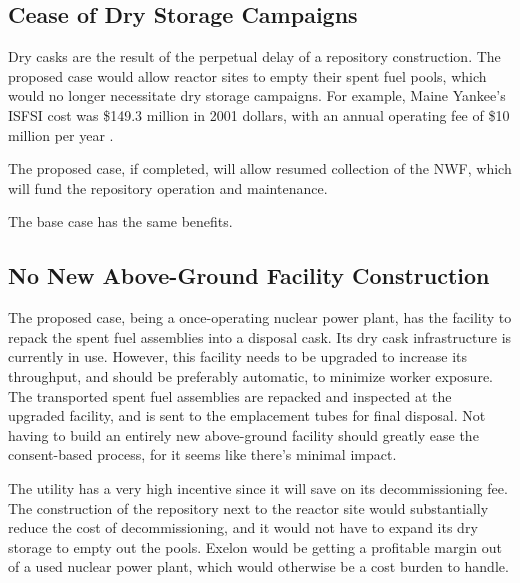  
\subsection{Cease of Dry Storage Campaigns}

Dry casks are the result of the perpetual delay of a repository construction.
The proposed case would allow reactor sites to empty their spent fuel pools, which
would no longer necessitate dry storage campaigns. For example, Maine Yankee's 
\gls{ISFSI} cost was \$149.3 million in 2001 dollars, with an annual operating fee
of \$10 million per year \cite{lee_costing_2009}. 

The proposed case, if completed, will allow resumed collection of the \gls{NWF}, 
which will fund the repository operation and maintenance.

The base case has the same benefits.



\subsection{No New Above-Ground Facility Construction}



The proposed case, being a once-operating nuclear power plant, has the facility to 
repack the spent fuel assemblies into a disposal cask. Its dry cask infrastructure 
is currently in use. However, this facility needs to be upgraded to increase its throughput, and should be preferably automatic, to minimize worker exposure. The transported spent fuel assemblies are repacked and inspected at the upgraded facility, and is sent to the emplacement tubes for final disposal. Not having to build an entirely new above-ground facility should greatly ease the consent-based process, for it seems like there's minimal impact. 
 
The utility has a very high incentive since it will save on its decommissioning fee.
The construction of the repository next to the reactor site would substantially
reduce the cost of decommissioning, and it would not have to expand its dry storage
to empty out the pools. Exelon would be getting a profitable margin out of a
used nuclear power plant, which would otherwise be a cost burden to handle.

